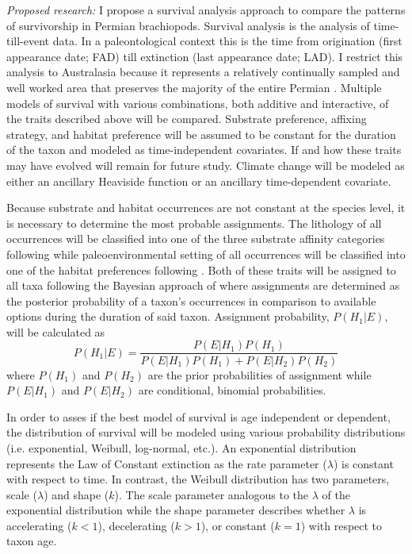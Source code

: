 \documentclass[12pt,letterpaper]{article}
\begin{document}
\textit{Proposed research:}
I propose a survival analysis approach to compare the patterns of survivorship in Permian brachiopods. Survival analysis is the analysis of time-till-event data. In a paleontological context this is the time from origination (first appearance date; FAD) till extinction (last appearance date; LAD). I restrict this analysis to Australasia because it represents a relatively continually sampled and well worked area that preserves the majority of the entire Permian \citep{Clapham2012,Clapham2008a,Waterhouse1987,Archbold1995}. Multiple models of survival with various combinations, both additive and interactive, of the traits described above will be compared. Substrate preference, affixing strategy, and habitat preference will be assumed to be constant for the duration of the taxon and modeled as time-independent covariates. If and how these traits may have evolved will remain for future study. Climate change will be modeled as either an ancillary Heaviside function or an ancillary time-dependent covariate.

Because substrate and habitat occurrences are not constant at the species level, it is necessary to determine the most probable assignments. The lithology of all occurrences will be classified into one of the three substrate affinity categories following \citet{Foote2006} while paleoenvironmental setting of all occurrences will be classified into one of the habitat preferences following \citet{Kiessling2007}. Both of these traits will be assigned to all taxa following the Bayesian approach of \citet{Simpson2009} where assignments are determined as the posterior probability of a taxon's occurrences in comparison to available options during the duration of said taxon. Assignment probability, \(P(H_{1}|E)\), will be calculated as
\begin{equation}
  P(H_{1}|E) = \frac{P(E|H_{1})P(H_{1})}{P(E|H_{1})P(H_{1}) + P(E|H_{2})P(H_{2})}
  \label{eq:aff}
\end{equation}
where \(P(H_{1})\) and \(P(H_{2})\) are the prior probabilities of assignment while \(P(E|H_{1})\) and \(P(E|H_{2})\) are conditional, binomial probabilities. 

In order to asses if the best model of survival is age independent or dependent, the distribution of survival will be modeled using various probability distributions (i.e. exponential, Weibull, log-normal, etc.). An exponential distribution represents the Law of Constant extinction as the rate parameter (\(\lambda\)) is constant with respect to time. In contrast, the Weibull distribution has two parameters, scale (\(\lambda\)) and shape (\(k\)). The scale parameter analogous to the \(\lambda\) of the exponential distribution while the shape parameter describes whether \(\lambda\) is accelerating (\(k < 1\)), decelerating (\(k > 1\)), or constant (\(k = 1\)) with respect to taxon age.
\end{document}
